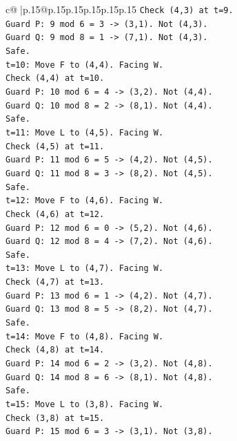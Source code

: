 \documentclass{article}
\begin{document}
{\begin{supertabular}{c@{$\;$}|p{.15\linewidth}@{}p{.15\linewidth}p{.15\linewidth}p{.15\linewidth}p{.15\linewidth}p{.15\linewidth}}
{{{\texttt{Check (4,3) at t=9.} \\
\texttt{Guard P: 9 mod 6 = 3 {-}> (3,1). Not (4,3).} \\
\texttt{Guard Q: 9 mod 8 = 1 {-}> (7,1). Not (4,3).} \\
\texttt{Safe.} \\
\texttt{t=10: Move F to (4,4). Facing W.} \\
\texttt{Check (4,4) at t=10.} \\
\texttt{Guard P: 10 mod 6 = 4 {-}> (3,2). Not (4,4).} \\
\texttt{Guard Q: 10 mod 8 = 2 {-}> (8,1). Not (4,4).} \\
\texttt{Safe.} \\
\texttt{t=11: Move L to (4,5). Facing W.} \\
\texttt{Check (4,5) at t=11.} \\
\texttt{Guard P: 11 mod 6 = 5 {-}> (4,2). Not (4,5).} \\
\texttt{Guard Q: 11 mod 8 = 3 {-}> (8,2). Not (4,5).} \\
\texttt{Safe.} \\
\texttt{t=12: Move F to (4,6). Facing W.} \\
\texttt{Check (4,6) at t=12.} \\
\texttt{Guard P: 12 mod 6 = 0 {-}> (5,2). Not (4,6).} \\
\texttt{Guard Q: 12 mod 8 = 4 {-}> (7,2). Not (4,6).} \\
\texttt{Safe.} \\
\texttt{t=13: Move L to (4,7). Facing W.} \\
\texttt{Check (4,7) at t=13.} \\
\texttt{Guard P: 13 mod 6 = 1 {-}> (4,2). Not (4,7).} \\
\texttt{Guard Q: 13 mod 8 = 5 {-}> (8,2). Not (4,7).} \\
\texttt{Safe.} \\
\texttt{t=14: Move F to (4,8). Facing W.} \\
\texttt{Check (4,8) at t=14.} \\
\texttt{Guard P: 14 mod 6 = 2 {-}> (3,2). Not (4,8).} \\
\texttt{Guard Q: 14 mod 8 = 6 {-}> (8,1). Not (4,8).} \\
\texttt{Safe.} \\
\texttt{t=15: Move L to (3,8). Facing W.} \\
\texttt{Check (3,8) at t=15.} \\
\texttt{Guard P: 15 mod 6 = 3 {-}> (3,1). Not (3,8).} \\
}}}
\end{supertabular}}
\end{document}
